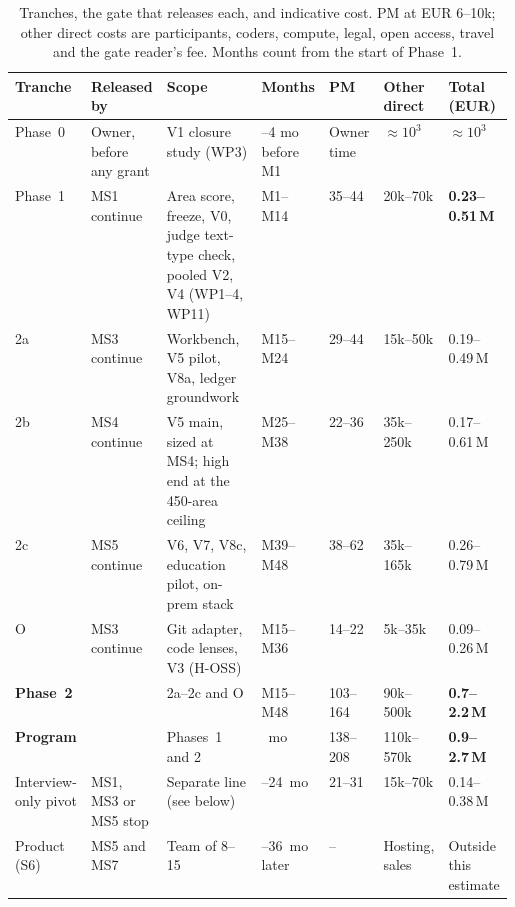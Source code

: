\begin{table}[htbp]
  \centering
  \footnotesize
  \caption{Tranches, the gate that releases each, and indicative cost. PM at EUR 6--10k; other
    direct costs are participants, coders, compute, legal, open access, travel and the gate
    reader's fee. Months count from the start of Phase~1.}
  \label{tab:resources-totals}
  \begin{tabularx}{\linewidth}{@{}>{\raggedright\arraybackslash}p{0.1\linewidth}>{\raggedright\arraybackslash}p{0.11\linewidth}>{\raggedright\arraybackslash}X>{\raggedright\arraybackslash}p{0.1\linewidth}p{0.07\linewidth}p{0.09\linewidth}p{0.11\linewidth}@{}}
    \toprule
    Tranche & Released by & Scope & Months & PM & Other direct & Total (EUR) \\
    \midrule
    Phase~0 & Owner, before any grant & V1 closure study (WP3) & 2--4 mo before M1 & Owner time &
      $\approx10^3$ & $\approx10^3$ \\
    Phase~1 & MS1 continue & Area score, freeze, V0, judge text-type check, pooled V2, V4 (WP1--4,
      WP11) & M1--M14 & 35--44 & 20k--70k & \textbf{0.23--0.51\,M} \\
    2a & MS3 continue & Workbench, V5 pilot, V8a, ledger groundwork & M15--M24 & 29--44 &
      15k--50k & 0.19--0.49\,M \\
    2b & MS4 continue & V5 main, sized at MS4; high end at the 450-area ceiling & M25--M38 & 22--36 &
      35k--250k & 0.17--0.61\,M \\
    2c & MS5 continue & V6, V7, V8c, education pilot, on-prem stack & M39--M48 & 38--62 &
      35k--165k & 0.26--0.79\,M \\
    O & MS3 continue & Git adapter, code lenses, V3 (H-OSS) & M15--M36 & 14--22 & 5k--35k &
      0.09--0.26\,M \\
    \midrule
    \textbf{Phase~2} & & 2a--2c and O & M15--M48 & 103--164 & 90k--500k &
      \textbf{0.7--2.2\,M} \\
    \textbf{Program} & & Phases~1 and 2 & 48~mo & 138--208 & 110k--570k & \textbf{0.9--2.7\,M} \\
    \midrule
    Interview-only pivot & MS1, MS3 or MS5 stop & Separate line (see below) & 18--24~mo & 21--31 &
      15k--70k & 0.14--0.38\,M \\
    Product (S6) & MS5 and MS7 & Team of 8--15 & 18--36~mo later & -- & Hosting, sales &
      Outside this estimate \\
    \bottomrule
  \end{tabularx}
\end{table}

